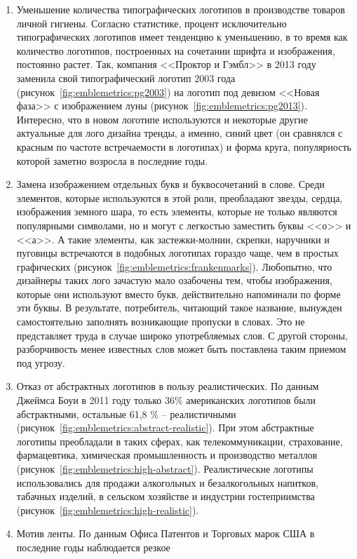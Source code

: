 \begin{enumerate}
\item Уменьшение количества  типографических логотипов в производстве товаров личной
  гигиены. Согласно статистике, процент исключительно типографических логотипов имеет тенденцию к
  уменьшению, в то время как количество логотипов,  построенных на сочетании шрифта и изображения,
  постоянно растет. Так, компания <<Проктор и Гэмбл>> в 2013 году заменила свой типографический
  логотип 2003 года (рисунок~\ref{fig:emblemetrics:pg2003}) на  логотип  под девизом <<Новая фаза>>
  с изображением луны (рисунок~\ref{fig:emblemetrics:pg2013}). Интересно, что в новом логотипе
  используются и некоторые другие актуальные для лого дизайна тренды,  а именно, синий цвет (он
  сравнялся с красным по частоте встречаемости в логотипах) и форма круга, популярность которой
  заметно возросла в последние годы.
\item Замена изображением отдельных букв и буквосочетаний в слове. Среди элементов, которые
  используются в этой роли, преобладают звезды, сердца, изображения земного шара, то есть элементы,
  которые не только являются популярными символами, но и могут с легкостью заместить буквы <<о>> и
  <<а>>. А такие элементы, как застежки-молнии, скрепки, наручники и пуговицы встречаются в подобных
  логотипах гораздо чаще, чем в простых графических (рисунок~\ref{fig:emblemetrics:frankenmarks}).
  Любопытно, что дизайнеры таких лого зачастую мало озабочены тем, чтобы изображения, которые они
  используют вместо букв, действительно напоминали по форме эти буквы. В результате, потребитель,
  читающий такое название, вынужден самостоятельно заполнять возникающие пропуски в словах. Это не
  представляет труда в случае широко употребляемых слов. С другой стороны,  разборчивость менее
  известных слов может быть поставлена таким приемом под угрозу.
\item Отказ от абстрактных логотипов в пользу реалистических. По данным Джеймса Боуи в 2011 году
  только 36\% американских логотипов были абстрактными, остальные 61,8 \% -- реалистичными
  (рисунок~\ref{fig:emblemetrics:abstract-realistic}). При этом абстрактные логотипы преобладали в
  таких сферах, как телекоммуникации, страхование, фармацевтика, химическая промышленность и
  производство металлов (рисунок~\ref{fig:emblemetrics:high-abstract}). Реалистические логотипы
  использовались для продажи алкогольных и безалкогольных напитков, табачных изделий, в сельском
  хозяйстве и индустрии гостеприимства (рисунок~\ref{fig:emblemetrics:high-realistic}).
\item Мотив ленты. По данным Офиса Патентов и Торговых марок США в последние годы наблюдается резкое

\end{enumerate}
